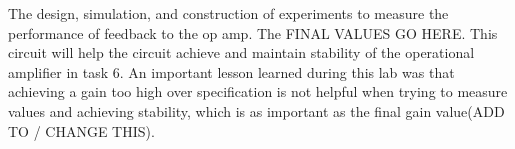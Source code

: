 
The design, simulation, and construction of experiments to measure the performance of feedback to the op amp. The FINAL VALUES GO HERE. This circuit will help the circuit achieve and maintain stability of the operational amplifier in task 6.  An important lesson learned during this lab was that achieving a gain too high over specification is not helpful when trying to measure values and achieving stability, which is as important as the final gain value(ADD TO / CHANGE THIS).

